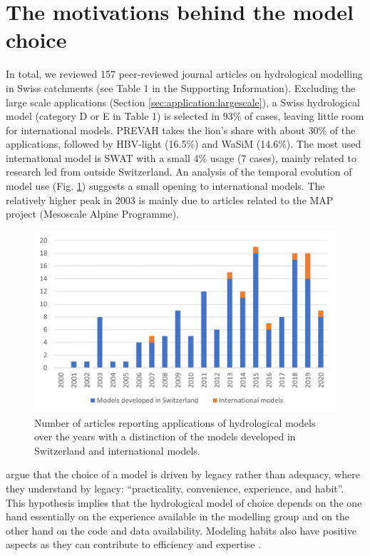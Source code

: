\documentclass[10pt,a4paper]{article}
\begin{document}
\section{The motivations behind the model choice}
\label{sec:motivations}

In total, we reviewed 157 peer-reviewed journal articles on hydrological modelling in Swiss catchments (see Table 1 in the Supporting Information). Excluding the large scale applications (Section \ref{sec:application:largescale}), a Swiss hydrological model (category D or E in Table 1) is selected in 93\% of cases, leaving little room for international models. PREVAH takes the lion's share with about 30\% of the applications, followed by HBV-light (16.5\%) and WaSiM (14.6\%). The most used international model is SWAT with a small 4\% usage (7 cases), mainly related to research led from outside Switzerland. An analysis of the temporal evolution of model use (Fig. \ref{fig:bars}) suggests a small opening to international models. The relatively higher peak in 2003 is mainly due to articles related to the MAP project (Mesoscale Alpine Programme).

\begin{figure}[htb]
	\begin{center}
		\includegraphics[width=0.70\columnwidth]{figures/histogram.png}
		\caption{{Number of articles reporting applications of hydrological models over the years with a distinction of the models developed in Switzerland and international models. {\label{fig:bars}}
		}}
	\end{center}
\end{figure}

\citet{Addor2019} argue that the choice of a model is driven by legacy rather than adequacy, where they understand by legacy: ``practicality, convenience, experience, and habit''. This hypothesis implies that the hydrological model of choice depends on the one hand essentially on the experience available in the modelling group and on the other hand on the code and data availability. Modeling habits also have positive aspects as they can contribute to efficiency and expertise \citep{Babel2019}.
\end{document}
